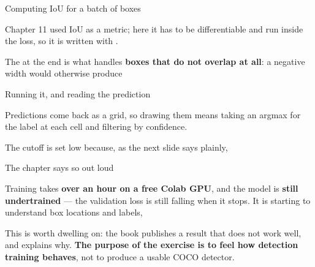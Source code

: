 \documentclass[aspectratio=169,11pt,t]{beamer}
\begin{document}
\begin{frame}[shrink=25]{Computing IoU for a batch of boxes}
{\fontsize{9.4}{12.6}\selectfont\color{fg2}Chapter 11 used IoU as a metric; here it has to be differentiable and run inside the loss, so it is written with .\par}\vskip 4pt
\begin{iband}[signal]
The  at the end is what handles \textbf{boxes that do not overlap at all}: a negative width would otherwise produce 
\end{iband}
\end{frame}

\begin{frame}[shrink=25]{Running it, and reading the prediction}
{\fontsize{9.4}{12.6}\selectfont\color{fg2}Predictions come back as a grid, so drawing them means taking an argmax for the label at each cell and filtering by confidence.\par}\vskip 4pt
{\fontsize{9.4}{12.6}\selectfont\color{fg2}The cutoff is set low because, as the next slide says plainly, \par}\vskip 4pt
\end{frame}

\begin{frame}[shrink=25]{The chapter says so out loud}
\begin{iband}[amber]
Training takes \textbf{over an hour on a free Colab GPU}, and the model is \textbf{still undertrained} --- the validation loss is still falling when it stops. It is starting to understand box locations and labels, 
\end{iband}
{\fontsize{9.4}{12.6}\selectfont\color{fg2}This is worth dwelling on: the book publishes a result that does not work well, and explains why. \textbf{The purpose of the exercise is to feel how detection training behaves}, not to produce a usable COCO detector.\par}\vskip 4pt
\end{frame}
\end{document}
